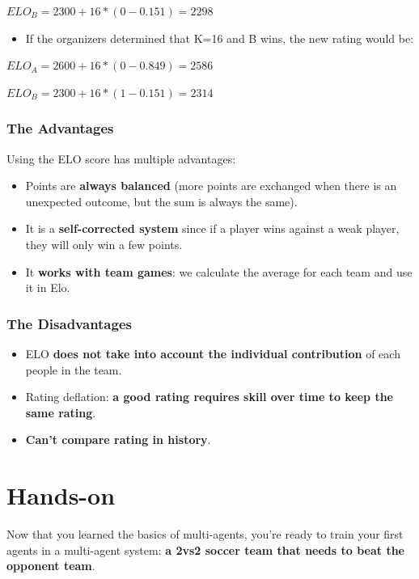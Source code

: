 \documentclass[11pt,a4paper]{article}
\begin{document}
\(ELO_B = 2300 + 16*(0-0.151) = 2298\)

\begin{itemize}
\tightlist
\item
  If the organizers determined that K=16 and B wins, the new rating would be:
\end{itemize}

\(ELO_A = 2600 + 16*(0-0.849) = 2586\)

\(ELO_B = 2300 + 16 *(1-0.151) = 2314\)

\subsubsection{The Advantages}\label{the-advantages}

Using the ELO score has multiple advantages:

\begin{itemize}
\tightlist
\item
  Points are \textbf{always balanced} (more points are exchanged when there is an unexpected outcome, but the sum is always the same).
\item
  It is a \textbf{self-corrected system} since if a player wins against a weak player, they will only win a few points.
\item
  It \textbf{works with team games}: we calculate the average for each team and use it in Elo.
\end{itemize}

\subsubsection{The Disadvantages}\label{the-disadvantages}

\begin{itemize}
\tightlist
\item
  ELO \textbf{does not take into account the individual contribution} of each people in the team.
\item
  Rating deflation: \textbf{a good rating requires skill over time to keep the same rating}.
\item
  \textbf{Can't compare rating in history}.
\end{itemize}

\section{Hands-on}\label{hands-on}

Now that you learned the basics of multi-agents, you're ready to train your first agents in a multi-agent system: \textbf{a 2vs2 soccer team that needs to beat the opponent team}.
\end{document}
